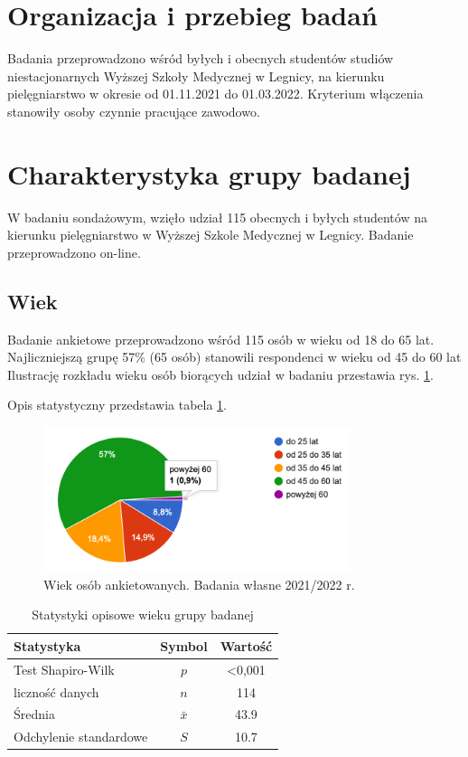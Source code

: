 \documentclass[a4paper,12pt,twoside,openany]{report}
\begin{document}
\section{Organizacja i przebieg badań}
Badania przeprowadzono wśród byłych i obecnych studentów studiów niestacjonarnych Wyższej Szkoły Medycznej w Legnicy, na kierunku pielęgniarstwo w okresie od 01.11.2021 do 01.03.2022. Kryterium włączenia stanowiły osoby czynnie pracujące zawodowo. 


\section{Charakterystyka grupy badanej}


W badaniu sondażowym, wzięło udział 115 obecnych i byłych studentów na kierunku pielęgniarstwo w Wyższej Szkole Medycznej w Legnicy. Badanie przeprowadzono on-line.


\subsection*{Wiek}

Badanie ankietowe przeprowadzono wśród 115 osób w wieku od 18 do 65 lat. Najliczniejszą grupę 57\%  (65 osób) stanowili respondenci w wieku od 45 do 60 lat 
Ilustrację rozkładu wieku osób biorących udział w badaniu przestawia rys. \ref{rys:wiek}.

Opis statystyczny przedstawia tabela \ref{tab:wiek}.



\begin{figure}[h]
\includegraphics[width=9cm]{char_gr_bad/wiek00}
\caption{Wiek osób ankietowanych. Badania własne 2021/2022 r.}
\label{rys:wiek}
\end{figure}


\begin {table}[h]
\caption{Statystyki opisowe wieku grupy badanej}
\begin{tabular}{|l|c|c|}
\hline
Statystyka & Symbol & Wartość\\
\hline
Test Shapiro-Wilk & $p$ & <0,001\\
\hline
liczność danych & $n$ & 114\\
\hline
Średnia & $\bar{x}$ & 43.9\\
\hline
Odchylenie standardowe & $S$ & 10.7\\
\hline

\end{tabular}
\label{tab:wiek}
\end{table}
\end{document}
